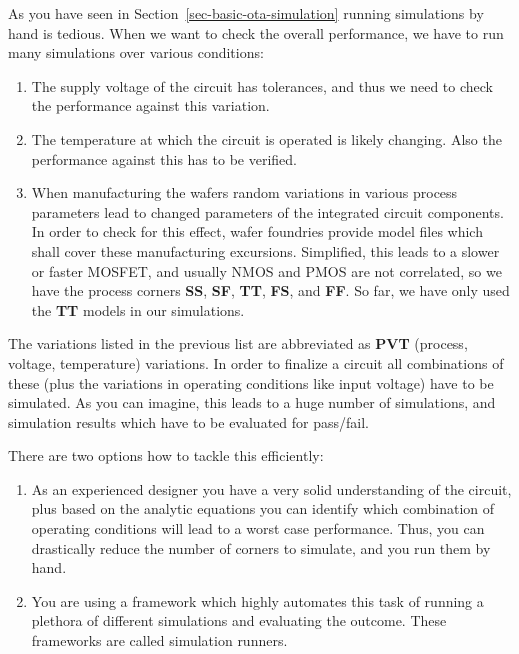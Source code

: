\documentclass[
  a4paper,
  DIV=11,
  numbers=noendperiod]{scrartcl}
\providecommand{\tightlist}{%
  \setlength{\itemsep}{0pt}\setlength{\parskip}{0pt}}\usepackage{longtable,booktabs,array}
\begin{document}
As you have seen in Section~\ref{sec-basic-ota-simulation} running
simulations by hand is tedious. When we want to check the overall
performance, we have to run many simulations over various conditions:

\begin{enumerate}
\def\labelenumi{\arabic{enumi}.}
\tightlist
\item
  The supply voltage of the circuit has tolerances, and thus we need to
  check the performance against this variation.
\item
  The temperature at which the circuit is operated is likely changing.
  Also the performance against this has to be verified.
\item
  When manufacturing the wafers random variations in various process
  parameters lead to changed parameters of the integrated circuit
  components. In order to check for this effect, wafer foundries provide
  model files which shall cover these manufacturing excursions.
  Simplified, this leads to a slower or faster MOSFET, and usually NMOS
  and PMOS are not correlated, so we have the process corners
  \textbf{SS}, \textbf{SF}, \textbf{TT}, \textbf{FS}, and \textbf{FF}.
  So far, we have only used the \textbf{TT} models in our simulations.
\end{enumerate}

The variations listed in the previous list are abbreviated as
\textbf{PVT} (process, voltage, temperature) variations. In order to
finalize a circuit all combinations of these (plus the variations in
operating conditions like input voltage) have to be simulated. As you
can imagine, this leads to a huge number of simulations, and simulation
results which have to be evaluated for pass/fail.

There are two options how to tackle this efficiently:

\begin{enumerate}
\def\labelenumi{\arabic{enumi}.}
\tightlist
\item
  As an experienced designer you have a very solid understanding of the
  circuit, plus based on the analytic equations you can identify which
  combination of operating conditions will lead to a worst case
  performance. Thus, you can drastically reduce the number of corners to
  simulate, and you run them by hand.
\item
  You are using a framework which highly automates this task of running
  a plethora of different simulations and evaluating the outcome. These
  frameworks are called simulation runners.
\end{enumerate}
\end{document}
